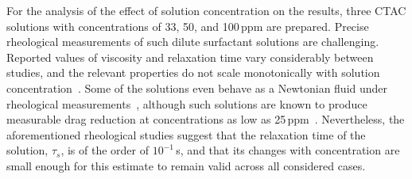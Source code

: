 \documentclass[aps,prfluids,groupedaddress,showkeys,11pt,tightenlines]{revtex4-2}
\begin{document}
For the analysis of the effect of solution concentration on the results, three CTAC solutions with concentrations of 33, 50, and 100\,ppm are prepared. Precise rheological measurements of such dilute surfactant solutions are challenging. Reported values of viscosity and relaxation time vary considerably between studies, and the relevant properties do not scale monotonically with solution concentration~\cite{kawaguchi2003rheological,zhang_effects_2008}. Some of the solutions even behave as a Newtonian fluid under rheological measurements~\cite{kawaguchi2003rheological}, although such solutions are known to produce measurable drag reduction at concentrations as low as 25\,ppm~\cite{li_experimental_2008}. Nevertheless, the aforementioned rheological studies suggest that the relaxation time of the solution, $\tau_s$, is of the order of $10^{-1}$\,s, and that its changes with concentration are small enough for this estimate to remain valid across all considered cases.



\end{document}
